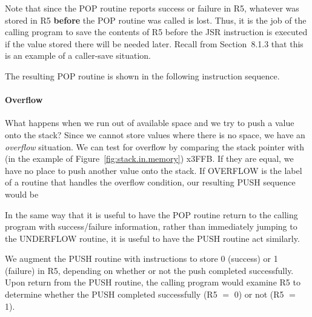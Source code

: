 \documentclass{patt}
\begin{document}
Note that since the POP routine reports success or failure in R5,
whatever was stored in R5 {\bf before} the POP routine was called is
lost. Thus, it is the job of the calling program to save the contents
of R5 before the JSR instruction is executed if the value stored there
will be needed later. Recall from Section~8.1.3 that this is an example 
of a caller-save situation.

The resulting POP routine is shown in the following instruction sequence.  


\paragraph{Overflow}

What happens when we run out of available space and we try to push a
value onto the stack? Since we cannot store values where there is no
space, we have an {\em overflow} situation. We can test for overflow by
 comparing the stack pointer with (in the example of
Figure~\ref{fig:stack.in.memory}) x3FFB.  If they are equal, we have
no place to push another value onto the stack.  If OVERFLOW is the
label of a routine that handles the overflow condition, our resulting
PUSH sequence would be


In the same way that it is useful to have the POP routine return to
the calling program with success/failure information, rather than
immediately jumping to the UNDERFLOW routine, it is useful to have the
PUSH routine act similarly.

We augment the PUSH routine with instructions to store 0 (success) or
1 (failure) in R5, depending on whether or not the push completed
successfully. Upon return from the PUSH routine, the calling program
would examine R5 to determine whether the PUSH completed successfully
(R5 $=$ 0) or not (R5 $=$ 1).
\end{document}
